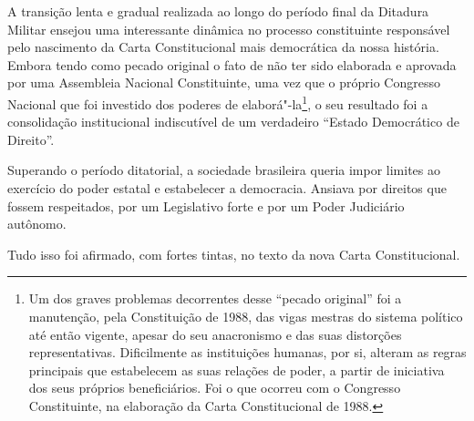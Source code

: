 A transição lenta e gradual realizada ao longo do período final da
Ditadura Militar ensejou uma interessante dinâmica no processo
constituinte responsável pelo nascimento da Carta Constitucional mais
democrática da nossa história. Embora tendo como pecado original o fato
de não ter sido elaborada e aprovada por uma Assembleia Nacional
Constituinte, uma vez que o próprio Congresso Nacional que foi
investido dos poderes de elaborá"-la\footnote{Um dos graves problemas
  decorrentes desse ``pecado original'' foi a manutenção, pela
  Constituição de 1988, das vigas mestras do sistema político até então
  vigente, apesar do seu anacronismo e das suas distorções
  representativas. Dificilmente as instituições humanas, por si, alteram
  as regras principais que estabelecem as suas relações de poder, a
  partir de iniciativa dos seus próprios beneficiários. Foi o que
  ocorreu com o Congresso Constituinte, na elaboração da Carta
  Constitucional de 1988.}, o seu resultado foi a consolidação
institucional indiscutível de um verdadeiro ``Estado Democrático
de Direito''.

Superando o período ditatorial, a sociedade brasileira queria impor
limites ao exercício do poder estatal e estabelecer a democracia.
Ansiava por direitos que fossem respeitados, por um Legislativo forte e
por um Poder Judiciário autônomo.

Tudo isso foi afirmado, com fortes tintas, no texto da nova Carta
Constitucional.

